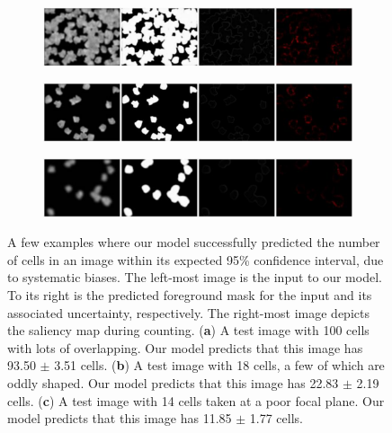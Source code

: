 \documentclass[10pt,twocolumn,letterpaper]{article}
\begin{document}
\begin{figure}[!h]
\centering
   \begin{subfigure}[b]{0.48\textwidth}
   \includegraphics[width=1.\textwidth]{bad-1}
   \caption{}
   \label{fig_bad1}
   \end{subfigure}

   \begin{subfigure}[b]{0.48\textwidth}
   \includegraphics[width=1.\textwidth]{bad-2}
   \caption{}
   \label{fig_bad2}
   \end{subfigure}
   
   \begin{subfigure}[b]{0.48\textwidth}
   \includegraphics[width=1.\textwidth]{bad-3}
   \caption{}
   \label{fig_bad3}
   \end{subfigure}
\caption{A few examples where our model successfully predicted the number of cells in an image within its expected 95\% confidence interval, due to systematic biases. The left-most image is the input to our model.
To its right is the predicted foreground mask for the input and its associated uncertainty, respectively.
The right-most image depicts the saliency map during counting. ({\bf a}) A test image with 100 cells with lots of overlapping. Our model predicts that this image has 93.50 $\pm$ 3.51 cells.
({\bf b}) A test image with 18 cells, a few of which are oddly shaped. Our model predicts that this image has 22.83 $\pm$ 2.19 cells.
({\bf c}) A test image with 14 cells taken at a poor focal plane. Our model predicts that this image has 11.85 $\pm$ 1.77 cells.}
\label{fig_bad}
\end{figure}
\end{document}
